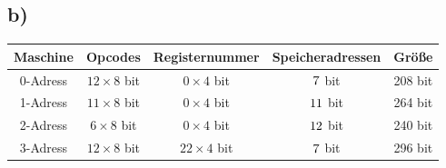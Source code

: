 \documentclass[a4paper]{scrartcl}
\begin{document}
	\subsection{b)}
		\begin{center}
			\begin{tabular}{c|c|c|c|c}
				Maschine & Opcodes & Registernummer & Speicheradressen & Größe \\ \hline
				0-Adress & \(12\times 8\) bit& \(0\times 4\) bit& \(7\time 16\) bit& 208 bit\\
				1-Adress & \(11\times 8\) bit& \(0\times 4\) bit& \(11\time 16\) bit& 264 bit\\
				2-Adress & \(6 \times 8\) bit& \(0\times 4\) bit& \(12\time 16\) bit& 240 bit\\
				3-Adress & \(12\times 8\) bit& \(22\times 4\) bit& \(7\time 16\) bit& 296 bit\\
			\end{tabular}
		\end{center}
	
\end{document}
